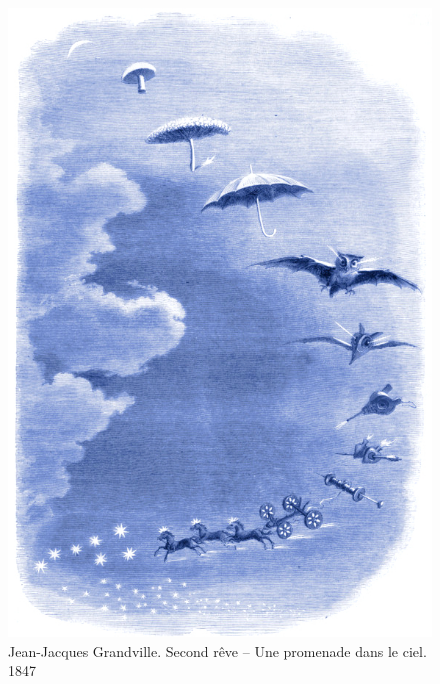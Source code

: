 \begin{figure}[htb]
    \captionsetup{labelformat=empty, skip=25pt}
	\includegraphics[width=\textwidth]{Artworks/Grandville_promenade.jpeg}
	\caption[]{Jean-Jacques Grandville. Second rêve – Une promenade dans le ciel. 1847}
\end{figure}

\cleardoublepage
